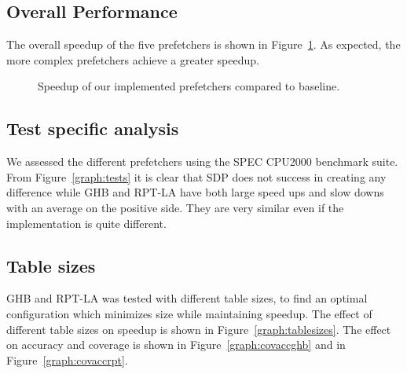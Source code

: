 \subsection{Overall Performance}
The overall speedup of the five prefetchers is shown in
Figure~\ref{graph:base}. As expected, the more complex prefetchers
achieve a greater speedup.
\begin{figure}[h]
    \caption{Speedup of our implemented prefetchers compared to baseline.}
    \label{graph:base}
\end{figure}

\subsection{Test specific analysis}
We assessed the different prefetchers using the SPEC CPU2000 benchmark suite.
From Figure~\ref{graph:tests} it is clear that SDP does not success in creating
any difference while GHB and RPT-LA have both large speed ups and slow downs with
an average on the positive side. They are very similar even if the
implementation is quite different.

\subsection{Table sizes}
GHB and RPT-LA was tested with different table sizes, to find an optimal
configuration which minimizes size while maintaining speedup. The
effect of different table sizes on speedup is shown in
Figure~\ref{graph:tablesizes}. The effect on accuracy and coverage is
shown in Figure~\ref{graph:covaccghb} and in Figure~\ref{graph:covaccrpt}.

